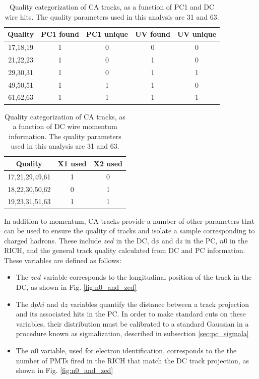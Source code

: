 \begin{table}[h!]
\caption{Quality categorization of CA tracks, as a function of PC1 and DC wire hits. The quality parameters used in this analysis are 31 and 63.}
\begin{center}
    \begin{tabular}{ccccc}
    \hline
    Quality & PC1 found  & PC1 unique & UV found & UV unique\\ \hline
    17,18,19 & 1 & 0 & 0 & 0\\ \hline
    21,22,23 & 1 & 0 & 1 & 0\\ \hline
    29,30,31 & 1 & 0 & 1 & 1\\ \hline
    49,50,51 & 1 & 1 & 1 & 0\\ \hline
    61,62,63 & 1 & 1 & 1 & 1\\ \hline
    \end{tabular}
\end{center}
\end{table}

\begin{table}[h!]
\caption{Quality categorization of CA tracks, as a function of DC wire momentum information. The quality parameters used in this analysis are 31 and 63.}
\begin{center}
    \begin{tabular}{ccc}
    \hline
    Quality & X1 used  & X2 used\\ \hline
    17,21,29,49,61 & 1 & 0 \\ \hline
    18,22,30,50,62 & 0 & 1 \\ \hline
    19,23,31,51,63 & 1 & 1 \\ \hline
    \end{tabular}
\end{center}
\end{table}

In addition to momentum, CA tracks provide a number of other parameters that can be used to ensure the quality of tracks and isolate a sample corresponding to charged hadrons. These include $zed$ in the DC, d$\phi$ and d$z$ in the PC, $n0$ in the RICH, and the general track quality calculated from DC and PC information. These variables are defined as follows:

\begin{itemize}
\item The $zed$ variable corresponds to the longitudinal position of the track in the DC, as shown in Fig. \ref{fig:n0_and_zed}
\item The d$phi$ and d$z$ variables quantify the distance between a track projection and its associated hits in the PC. In order to make standard cuts on these variables, their distribution must be calibrated to a standard Gaussian in a procedure known as sigmalization, described in subsection \ref{sec:pc_sigmala}
\item The $n0$ variable, used for electron identification, corresponds to the the number of PMTs fired in the RICH that match the DC track projection, as shown in Fig. \ref{fig:n0_and_zed}
\end{itemize}

